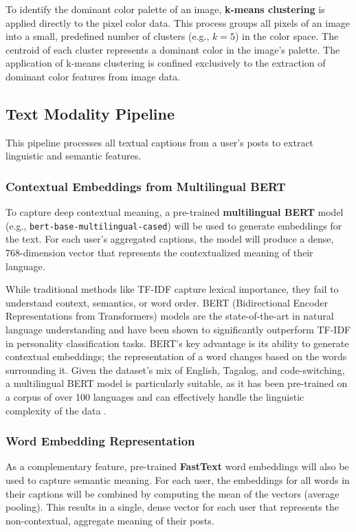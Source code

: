 To identify the dominant color palette of an image, \textbf{k-means clustering} is applied directly to the pixel color data. This process groups all pixels of an image into a small, predefined number of clusters (e.g., $k=5$) in the color space. The centroid of each cluster represents a dominant color in the image's palette. The application of k-means clustering is confined exclusively to the extraction of dominant color features from image data.

\subsection{Text Modality Pipeline}
This pipeline processes all textual captions from a user's posts to extract linguistic and semantic features.

\subsubsection{Contextual Embeddings from Multilingual BERT}
To capture deep contextual meaning, a pre-trained \textbf{multilingual BERT} model (e.g., \texttt{bert-base-multilingual-cased}) will be used to generate embeddings for the text. For each user's aggregated captions, the model will produce a dense, 768-dimension vector that represents the contextualized meaning of their language.

While traditional methods like TF-IDF capture lexical importance, they fail to understand context, semantics, or word order. BERT (Bidirectional Encoder Representations from Transformers) models are the state-of-the-art in natural language understanding and have been shown to significantly outperform TF-IDF in personality classification tasks. BERT's key advantage is its ability to generate contextual embeddings; the representation of a word changes based on the words surrounding it. Given the dataset's mix of English, Tagalog, and code-switching, a multilingual BERT model is particularly suitable, as it has been pre-trained on a corpus of over 100 languages and can effectively handle the linguistic complexity of the data \citep{devlin2018bert, cruz2022roberta}.

\subsubsection{Word Embedding Representation}
As a complementary feature, pre-trained \textbf{FastText} word embeddings will also be used to capture semantic meaning. For each user, the embeddings for all words in their captions will be combined by computing the mean of the vectors (average pooling). This results in a single, dense vector for each user that represents the non-contextual, aggregate meaning of their posts.

